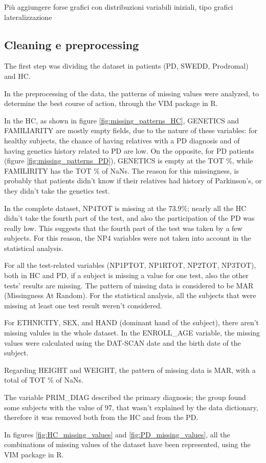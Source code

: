 \documentclass[]{article}
\begin{document}
\begin{multicols}{2}
Più aggiungere forse grafici con distribuzioni variabili iniziali, tipo grafici lateralizzazione

\subsection{Cleaning e preprocessing}

The first step was dividing the dataset in patients (PD, SWEDD, Prodromal) and HC.

In the preprocessing of the data, the patterns of missing values were analyzed, to determine the best course of action, through the VIM package in R.

In the HC, as shown in figure \ref{fig:missing_patterns_HC}, GENETICS and FAMILIARITY are mostly empty fields, due to the nature of these variables: for healthy subjects, the chance of having relatives with a PD diagnosis and of having genetics history related to PD are low. On the opposite, for PD patients (figure \ref{fig:missing_patterns_PD}), GENETICS is empty at the TOT \%, while FAMILIRITY has the TOT \% of NaNs. The reason for this missingness, is probably that patients didn't know if their relatives had history of Parkinson's, or they didn't take the genetics test. 

In the complete dataset, NP4TOT is missing at the 73.9\%; nearly all the HC didn't take the fourth part of the test, and also the participation of the PD was really low. This suggests that the fourth part of the test was taken by a few subjects. For this reason, the NP4 variables were not taken into account in the statistical analysis.

For all the test-related variables (NP1PTOT, NP1RTOT, NP2TOT, NP3TOT), both in HC and PD, if a subject is missing a value for one test, also the other tests' results are missing. The pattern of missing data is considered to be MAR (Missingness At Random). For the statistical analysis, all the subjects that were missing at least one test result weren't considered.  

For ETHNICITY, SEX, and HAND (dominant hand of the subject), there aren't missing valules in the whole dataset. In the ENROLL\_AGE variable, the missing values were calculated using the DAT-SCAN date and the birth date of the subject.

Regarding HEIGHT and WEIGHT, the pattern of missing data is MAR, with a total of TOT \% of NaNs. 

The variable PRIM\_DIAG described the primary diagnosis; the group found some subjects with the value of 97, that wasn't explained by the data dictionary, therefore it was removed both from the HC and from the PD. 

In figures \ref{fig:HC_missing_values} and \ref{fig:PD_missing_values}, all the combinations of missing values of the dataset have been represented, using the VIM package in R.


\end{multicols}
\end{document}

